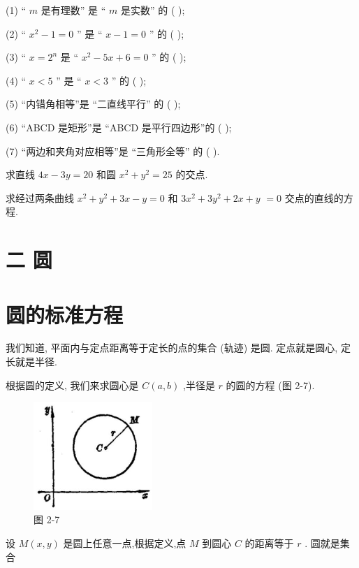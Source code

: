 \documentclass[lang=cn,newtx,10pt,scheme=chinese]{elegantbook}
\begin{document}
\begin{problemset}[习 题 四]
(1) “ \(m\) 是有理数” 是 “ \(m\) 是实数” 的 ( );

(2) “ \({x}^{2} - 1 = 0\) ” 是 “ \(x - 1 = 0\) ” 的 ( );

(3) “ \(x = {2}^{n}\) 是 “ \({x}^{2} - {5x} + 6 = 0\) ” 的 ( );

(4) “ \(x < 5\) ” 是 “ \(x < 3\) ” 的 ( );

(5) “内错角相等”是 “二直线平行” 的 ( );

(6) “ABCD 是矩形”是 “ABCD 是平行四边形”的 ( );

(7) “两边和夹角对应相等”是 “三角形全等” 的 ( ).

\item 求直线 \({4x} - {3y} = {20}\) 和圆 \({x}^{2} + {y}^{2} = {25}\) 的交点.

\item 求经过两条曲线 \({x}^{2} + {y}^{2} + {3x} - y = 0\) 和 \(3{x}^{2} + 3{y}^{2} + {2x} + y\) \(= 0\) 交点的直线的方程.
\end{problemset}

\section*{二 圆}

\section{圆的标准方程}

我们知道, 平面内与定点距离等于定长的点的集合 (轨迹) 是圆. 定点就是圆心, 定长就是半径.

根据圆的定义, 我们来求圆心是 \(C\left( {a,b}\right)\) ,半径是 \(r\) 的圆的方程 (图 2-7).

\begin{figure}[h]
  \centering
  \includegraphics[max width=0.4\textwidth]{images/01912cc2-ffb6-728e-9ae7-b113ff05c64b_77_682858.jpg}
  \caption{图 2-7}
\end{figure}



设 \(M\left( {x,y}\right)\) 是圆上任意一点,根据定义,点 \(M\) 到圆心 \(C\) 的距离等于 \(r\) . 圆就是集合
\end{document}
